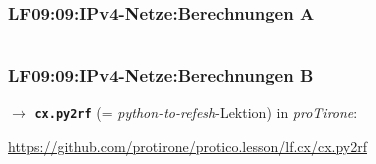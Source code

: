 \begin{frame}[fragile]  
  \frametitle{LF09:09:IPv4-Netze:Berechnungen A}

    \begin{center}
    \begin{minipage}{0.9\textwidth}
  
      \inputminted[fontsize=\footnotesize,linenos]{python}{\snpLf/ex-090904-nw-validation.py}

    \end{minipage}
    \end{center}
\end{frame}

\begin{frame}[fragile]  
  \frametitle{LF09:09:IPv4-Netze:Berechnungen B}

    $\rightarrow$ \texttt{\textbf{cx.py2rf}} (= \textit{python-to-refesh}-Lektion) in \textit{proTirone}:
  
    \begin{center}
      \href{https://github.com/protirone/protico.lesson/lf.cx/cx.py2rf}{https://github.com/protirone/protico.lesson/lf.cx/cx.py2rf}
    \end{center}
\end{frame}

